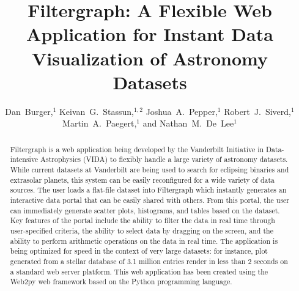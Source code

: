 
\resetcounters




\title{Filtergraph: A Flexible Web Application for Instant Data Visualization of Astronomy Datasets}

\author{Dan~Burger,$^1$ Keivan~G.~Stassun,$^{1,2}$ Joshua~A.~Pepper,$^1$
Robert~J.~Siverd,$^1$ Martin~A.~Paegert,$^1$ and Nathan~M.~De~Lee$^1$
}


\begin{abstract}
Filtergraph is a web application being developed by the Vanderbilt Initiative in Data-intensive Astrophysics (VIDA) to flexibly handle a large variety of astronomy datasets. While current datasets at Vanderbilt are being used to search for eclipsing binaries and extrasolar planets, this system can be easily reconfigured for a wide variety of data sources. The user loads a flat-file dataset into Filtergraph which instantly generates an interactive data portal that can be easily shared with others. From this portal, the user can immediately generate scatter plots, histograms, and tables based on the dataset. Key features of the portal include the ability to filter the data in real time through user-specified criteria, the ability to select data by dragging on the screen, and the ability to perform arithmetic operations on the data in real time. The application is being optimized for speed in the context of very large datasets: for instance, plot generated from a stellar database of 3.1 million entries render in less than 2 seconds on a standard web server platform. This web application has been created using the Web2py web framework based on the Python programming language. 
\end{abstract}

